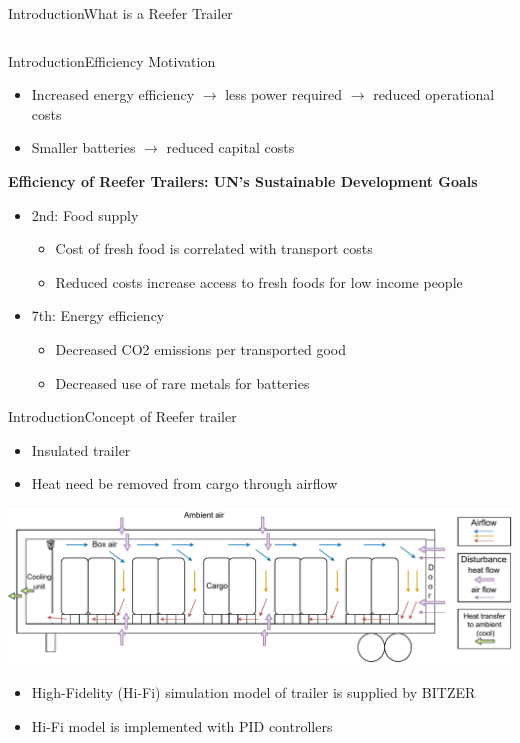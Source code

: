 \begin{frame}{Introduction}{What is a Reefer Trailer}
\begin{columns}
\begin{column}{.5\textwidth}
 		\end{column}
 	\end{columns}	
\end{frame}


\begin{frame}{Introduction}{Efficiency Motivation}
	\begin{itemize}
		\item Increased energy efficiency $\rightarrow$ less power required $\rightarrow$ reduced operational costs  
		\item Smaller batteries $\rightarrow$ reduced capital costs		
	\end{itemize}
	\textbf{Efficiency of Reefer Trailers: UN's Sustainable Development Goals}
	\begin{itemize}	
		\item 2nd: Food supply
		\begin{itemize}
			\item Cost of fresh food is correlated with transport costs
			\item Reduced costs increase access to fresh foods for low income people		
		\end{itemize}
		\item 7th: Energy efficiency
		\begin{itemize}
			\item Decreased CO2 emissions per transported good
			\item Decreased use of rare metals for batteries	
		\end{itemize}
	\end{itemize}	
\end{frame}

\begin{frame}{Introduction}{Concept of Reefer trailer}
	\begin{itemize}
		\item Insulated trailer
		\item Heat need be removed from cargo through airflow	
	\end{itemize}
	\includegraphics[width=1\textwidth]{../Graphics/Trailer_airflow.pdf}
	\begin{itemize}
		\item High-Fidelity (Hi-Fi) simulation model of trailer is supplied by BITZER
		\item Hi-Fi model is implemented with PID controllers
	\end{itemize}
\end{frame}

